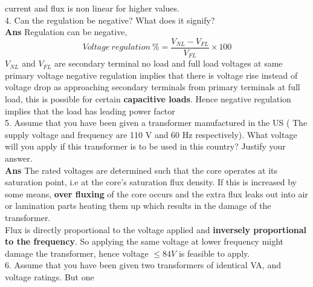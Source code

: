 \documentclass[12pt]{article}
\begin{document}
current and flux is non linear for higher values. \vspace{0.2cm}\\
    4. Can the regulation be negative? What does it signify?
    \vspace{0.1cm} \\
    \textbf{Ans} Regulation can be negative, 
    \begin{equation}
        Voltage \ regulation \ \% = \frac{V_{NL} - V_{FL}}{V_{FL}}\times 100
    \end{equation}
    $V_{NL}$ and $V_{FL}$ are secondary terminal no load and full load voltages at same primary voltage
    negative regulation implies that there is voltage rise instead of voltage drop as approaching secondary terminals from primary terminals at full load, this is possible for certain \textbf{capacitive loads}. Hence negative regulation implies that the load has leading power factor \vspace{0.2cm} \\
     5. Assume that you have been given a transformer manufactured in the US ( The supply voltage
    and frequency are 110 V and 60 Hz respectively). What voltage will you apply if this transformer
    is to be used in this country? Justify your answer.
    \vspace{0.1cm} \\
    \textbf{Ans} The rated voltages are determined such that the core operates at its saturation point, i.e at the core's saturation flux density. If this is increased by some means,\textbf{ over fluxing} of the core occurs and the extra flux leaks out into air or lamination parts heating them up which results in the damage of the transformer.\\
    Flux is directly proportional to the voltage applied and \textbf{inversely proportional to the frequency}. So applying the same voltage at lower frequency might damage the transformer, hence voltage $\leq 84V$ is feasible to apply. \vspace{0.2cm}\\
    6. Assume that you have been given two transformers of identical VA, and voltage ratings. But one
\end{document}
